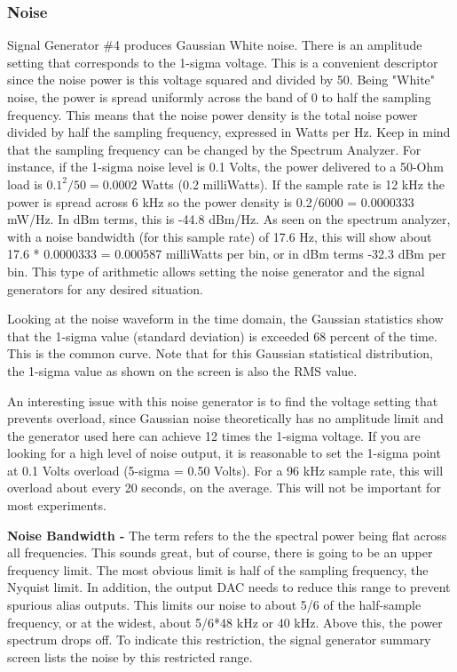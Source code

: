 \subsubsection{Noise}
\label{subsect:ASGNoise}
Signal  Generator \#4 produces Gaussian White noise.  There is an amplitude setting that corresponds to the 1-sigma voltage.  This is a convenient descriptor since the noise power is this voltage squared and divided by 50.  Being "White" noise, the power is spread uniformly across the band  of 0 to half the sampling frequency.  This means that the noise power density is the total noise power divided by half the sampling frequency,  expressed in Watts per Hz.  Keep in mind that the sampling frequency can be changed by the Spectrum Analyzer. For instance, if the 1-sigma noise level is 0.1 Volts, the power delivered to a 50-Ohm load is $0.1^2/50 = 0.0002$ Watts (0.2 milliWatts).   If the sample rate is 12 kHz the power is spread across 6 kHz so the power density is 0.2/6000 = 0.0000333 mW/Hz.  In dBm terms, this is -44.8 dBm/Hz.  As seen on the spectrum analyzer, with a noise bandwidth (for this sample rate) of 17.6 Hz, this will show about 17.6 * 0.0000333 = 0.000587 milliWatts per bin, or in dBm terms -32.3 dBm per bin.   This type of arithmetic allows setting the noise generator and the signal generators for any desired situation.

Looking at the noise waveform in the time domain,  the Gaussian statistics show that the 1-sigma value (standard deviation) is exceeded 68 percent of the time.  This is the common  curve.  Note that for this Gaussian statistical distribution, the 1-sigma value as shown on the screen is also the RMS value. 

An interesting issue with this noise generator is to find the voltage setting that prevents overload, since Gaussian noise theoretically has no amplitude limit and the generator used here can achieve 12 times the 1-sigma voltage.  If you are looking for a high level of noise output, it is reasonable to set the 1-sigma point at 0.1 Volts overload (5-sigma = 0.50 Volts). For a 96 kHz sample rate, this will overload about every 20 seconds, on the average.  This will not be important for most experiments.

\textbf{Noise Bandwidth - }The term  refers to the the spectral power being flat across all frequencies.   This sounds great, but of course, there is going to be an upper frequency limit.  The most obvious limit is half of the sampling frequency, the Nyquist limit.  In addition, the output DAC needs to reduce this range to prevent spurious alias outputs.  This limits our noise to about 5/6 of the half-sample frequency, or at the widest, about 5/6*48 kHz or 40 kHz.  Above this, the power spectrum drops off.  To indicate this restriction, the signal generator summary screen lists the noise by this restricted range.
